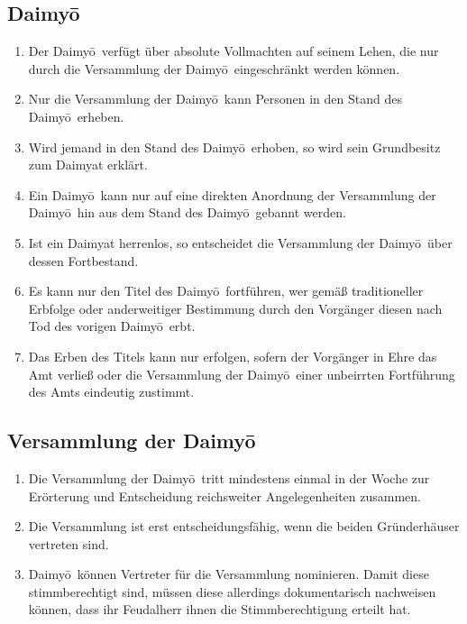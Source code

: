 \documentclass{article}
\newcommand{\longO}{ō}
\begin{document}
\subsection{Daimy\longO}
\begin{enumerate}
    \item Der Daimy\longO\ verfügt über absolute Vollmachten auf seinem Lehen, die nur durch die Versammlung der Daimy\longO\ eingeschränkt werden können.
    \item Nur die Versammlung der Daimy\longO\ kann Personen in den Stand des Daimy\longO\ erheben.
    \item Wird jemand in den Stand des Daimy\longO\ erhoben, so wird sein Grundbesitz zum Daimyat erklärt.
    \item Ein Daimy\longO\ kann nur auf eine direkten Anordnung der Versammlung der Daimy\longO\ hin aus dem Stand des Daimy\longO\ gebannt werden.
    \item Ist ein Daimyat herrenlos, so entscheidet die Versammlung der Daimy\longO\ über dessen Fortbestand.
    \item Es kann nur den Titel des Daimy\longO\ fortführen, wer gemäß traditioneller Erbfolge oder anderweitiger Bestimmung durch den Vorgänger diesen nach Tod des vorigen Daimy\longO\ erbt.
    \item Das Erben des Titels kann nur erfolgen, sofern der Vorgänger in Ehre das Amt verließ oder die Versammlung der Daimy\longO\ einer unbeirrten Fortführung des Amts eindeutig zustimmt.
\end{enumerate}

\subsection{Versammlung der Daimy\longO}
\begin{enumerate}
    \item Die Versammlung der Daimy\longO\ tritt mindestens einmal in der Woche zur Erörterung und Entscheidung reichsweiter Angelegenheiten zusammen.
    \item Die Versammlung ist erst entscheidungsfähig, wenn die beiden Gründerhäuser vertreten sind.
    \item Daimy\longO\ können Vertreter für die Versammlung nominieren. Damit diese stimmberechtigt sind, müssen diese allerdings dokumentarisch nachweisen können, dass
          ihr Feudalherr ihnen die Stimmberechtigung erteilt hat.
\end{enumerate}
\end{document}
